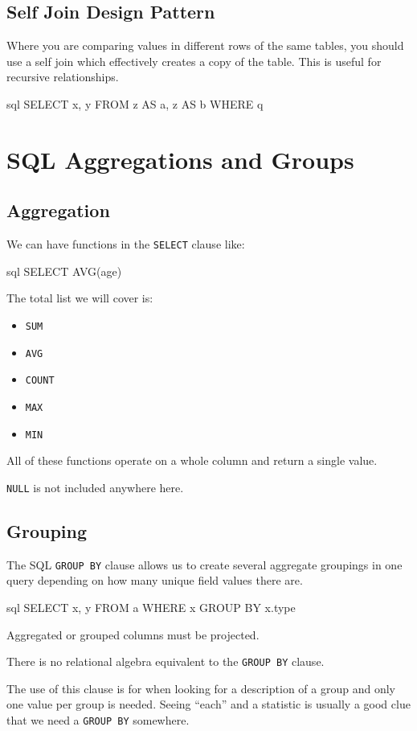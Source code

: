 \subsection{Self Join Design Pattern}\label{sub:self_join_design_pattern}

Where you are comparing values in different rows of the same tables, you should use a self join which effectively creates a copy of the table.
This is useful for recursive relationships.
\begin{code}{sql}
    SELECT x, y FROM z AS a, z AS b WHERE q
\end{code}

\section{SQL Aggregations and Groups}\label{sec:sql_aggregations_and_groups}

\subsection{Aggregation}\label{sub:aggregationdsrseven}

We can have functions in the \texttt{SELECT} clause like:
\begin{code}{sql}
    SELECT AVG(age)
\end{code}
The total list we will cover is:
\begin{itemize}
    \item \texttt{SUM}
    \item \texttt{AVG}
    \item \texttt{COUNT}
    \item \texttt{MAX}
    \item \texttt{MIN}
\end{itemize}
All of these functions operate on a whole column and return a single value.
\begin{note}
    \texttt{NULL} is not included anywhere here.
\end{note}

\subsection{Grouping}\label{sub:grouping}

The SQL \texttt{GROUP BY} clause allows us to create several aggregate groupings in one query depending on how many unique field values there are.
\begin{code}{sql}
    SELECT x, y FROM a WHERE x GROUP BY x.type
\end{code}
\begin{note}
    Aggregated or grouped columns must be projected.
\end{note}
\begin{note}
    There is no relational algebra equivalent to the \texttt{GROUP BY} clause.
\end{note}
The use of this clause is for when looking for a description of a group and only one value per group is needed.
Seeing ``each'' and a statistic is usually a good clue that we need a \texttt{GROUP BY} somewhere.

